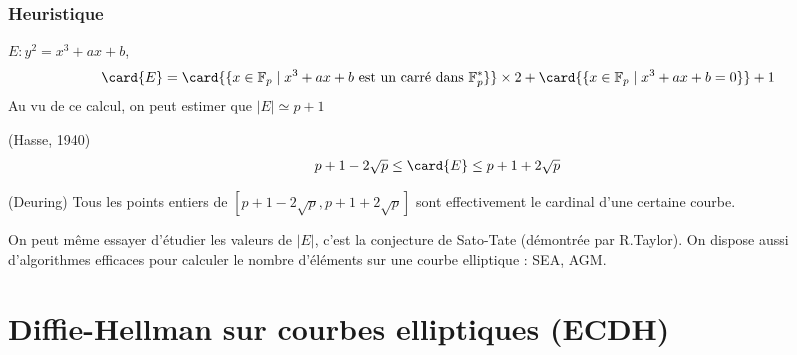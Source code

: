            \subsubsection{Heuristique}
                $E : y^2 = x^3 + ax + b$,
                \begin{align*}
                    \card{E} &= \card{\{x \in \mathbb{F}_p \mid x^3 + ax + b \text{ est un carré dans } \mathbb{F}_p^*\}} \times 2 + \card{\{x \in \mathbb{F}_p \mid x^3 + ax + b = 0\}} + 1 \\
                \end{align*}
                Au vu de ce calcul, on peut estimer que $|E| \simeq p + 1$
                \begin{theo} (Hasse, 1940)
                    \begin{align*}
                        p + 1 - 2\sqrt{p} \leq \card{E} \leq p + 1 + 2 \sqrt{p}
                    \end{align*}
                \end{theo}
                \begin{theo} (Deuring)
                    Tous les points entiers de $[p + 1 - 2\sqrt{p}, p + 1 + 2\sqrt{p}]$ sont effectivement le cardinal d'une certaine courbe.
                \end{theo}
                On peut même essayer d'étudier les valeurs de $|E|$, c'est la conjecture de Sato-Tate (démontrée par R.Taylor). On dispose aussi d'algorithmes efficaces pour calculer le nombre d'éléments sur une courbe elliptique : SEA, AGM.

    \section{Diffie-Hellman sur courbes elliptiques (ECDH)}
